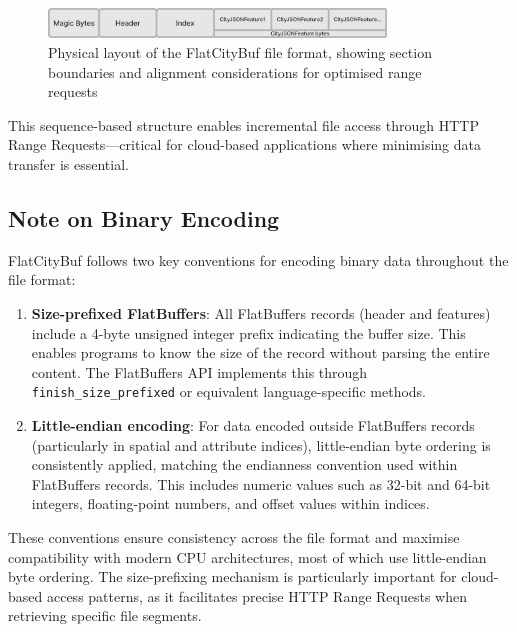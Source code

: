 \begin{figure}[h]
  \centering
  \includegraphics[width=0.8\textwidth]{figs/methodology/file_structure.png}
  \caption{Physical layout of the FlatCityBuf file format, showing section boundaries and alignment considerations for optimised range requests}
  \label{fig:methodology:file-structure}
\end{figure}

This sequence-based structure enables incremental file access through HTTP Range Requests—critical for cloud-based applications where minimising data transfer is essential.

\subsection{Note on Binary Encoding}
\label{methodology:overview:note_on_binary_encoding}
FlatCityBuf follows two key conventions for encoding binary data throughout the file format:

\begin{enumerate}
  \item \textbf{Size-prefixed FlatBuffers}: All FlatBuffers records (header and features) include a 4-byte unsigned integer prefix indicating the buffer size. This enables programs to know the size of the record without parsing the entire content. The FlatBuffers API implements this through \texttt{finish\_size\_prefixed} or equivalent language-specific methods.
  \item \textbf{Little-endian encoding}: For data encoded outside FlatBuffers records (particularly in spatial and attribute indices), little-endian byte ordering is consistently applied, matching the endianness convention used within FlatBuffers records. This includes numeric values such as 32-bit and 64-bit integers, floating-point numbers, and offset values within indices.
\end{enumerate}

These conventions ensure consistency across the file format and maximise compatibility with modern CPU architectures, most of which use little-endian byte ordering. The size-prefixing mechanism is particularly important for cloud-based access patterns, as it facilitates precise HTTP Range Requests when retrieving specific file segments.
